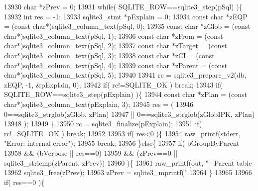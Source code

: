 \begin{DoxyCode}
{13930     \textcolor{keywordtype}{char} *zPrev = 0;
13931     \textcolor{keywordflow}{while}( SQLITE_ROW==sqlite3_step(pSql) )\{
13932       \textcolor{keywordtype}{int} res = -1;
13933       sqlite3_stmt *pExplain = 0;
13934       \textcolor{keyword}{const} \textcolor{keywordtype}{char} *zEQP = (\textcolor{keyword}{const} \textcolor{keywordtype}{char}*)sqlite3_column_text(pSql, 0);
13935       \textcolor{keyword}{const} \textcolor{keywordtype}{char} *zGlob = (\textcolor{keyword}{const} \textcolor{keywordtype}{char}*)sqlite3_column_text(pSql, 1);
13936       \textcolor{keyword}{const} \textcolor{keywordtype}{char} *zFrom = (\textcolor{keyword}{const} \textcolor{keywordtype}{char}*)sqlite3_column_text(pSql, 2);
13937       \textcolor{keyword}{const} \textcolor{keywordtype}{char} *zTarget = (\textcolor{keyword}{const} \textcolor{keywordtype}{char}*)sqlite3_column_text(pSql, 3);
13938       \textcolor{keyword}{const} \textcolor{keywordtype}{char} *zCI = (\textcolor{keyword}{const} \textcolor{keywordtype}{char}*)sqlite3_column_text(pSql, 4);
13939       \textcolor{keyword}{const} \textcolor{keywordtype}{char} *zParent = (\textcolor{keyword}{const} \textcolor{keywordtype}{char}*)sqlite3_column_text(pSql, 5);
13940 
13941       rc = sqlite3_prepare_v2(db, zEQP, -1, &pExplain, 0);
13942       \textcolor{keywordflow}{if}( rc!=SQLITE_OK ) \textcolor{keywordflow}{break};
13943       \textcolor{keywordflow}{if}( SQLITE_ROW==sqlite3_step(pExplain) )\{
13944         \textcolor{keyword}{const} \textcolor{keywordtype}{char} *zPlan = (\textcolor{keyword}{const} \textcolor{keywordtype}{char}*)sqlite3_column_text(pExplain, 3);
13945         res = (
13946               0==sqlite3_strglob(zGlob, zPlan)
13947            || 0==sqlite3_strglob(zGlobIPK, zPlan)
13948         );
13949       \}
13950       rc = sqlite3_finalize(pExplain);
13951       \textcolor{keywordflow}{if}( rc!=SQLITE_OK ) \textcolor{keywordflow}{break};
13952 
13953       \textcolor{keywordflow}{if}( res<0 )\{
13954         raw_printf(stderr, \textcolor{stringliteral}{"Error: internal error"});
13955         \textcolor{keywordflow}{break};
13956       \}\textcolor{keywordflow}{else}\{
13957         \textcolor{keywordflow}{if}( bGroupByParent
13958         && (bVerbose || res==0)
13959         && (zPrev==0 || sqlite3_stricmp(zParent, zPrev))
13960         )\{
13961           raw_printf(out, \textcolor{stringliteral}{"-- Parent table %
13962           sqlite3_free(zPrev);
13963           zPrev = sqlite3_mprintf(\textcolor{stringliteral}{"%
13964         \}
13965 
13966         \textcolor{keywordflow}{if}( res==0 )\{
}}}
\end{DoxyCode}
